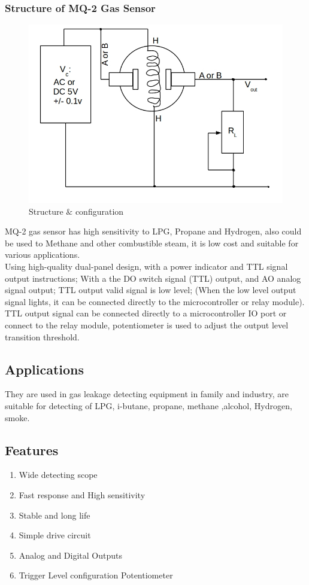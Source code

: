 \subsubsection{Structure of MQ-2 Gas Sensor}
\begin{figure}[h]
\center
\includegraphics[scale=0.5]{smoke_new.jpg} 
\caption{Structure $\&$ configuration}
\end{figure}
\justify MQ-2 gas sensor has high sensitivity to LPG, Propane and Hydrogen, also could be used to Methane and other combustible steam, it is low cost and suitable for various applications.\\
Using high-quality dual-panel\cite{mq2datasheet} design, with a power indicator and TTL signal output instructions; With a the DO switch signal (TTL) output, and AO analog signal output; TTL output valid signal is low level; (When the low level output signal lights, it can be connected directly to the microcontroller or relay module).\\
TTL output signal can be connected directly to a microcontroller IO port or connect to the relay module, potentiometer is used to adjust the output level transition threshold.
\subsection*{Applications}
They are used in gas leakage detecting equipment in family and industry, are suitable for detecting
of LPG, i-butane, propane, methane ,alcohol, Hydrogen, smoke.
\subsection*{Features}
\begin{enumerate}
\item Wide detecting scope 
\item Fast response and High sensitivity
\item Stable and long life 
\item Simple drive circuit
\item Analog and Digital Outputs
\item Trigger Level configuration Potentiometer 
\end{enumerate}
